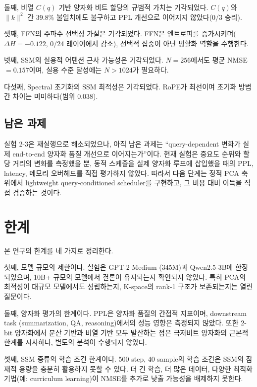 \documentclass[11pt,a4paper]{article}
\newcommand{\Cq}{C(q)}
\newcommand{\knorm}{\|k\|^2}
\begin{document}
둘째, 비열 $\Cq$ 기반 양자화 비트 할당의 규범적 가치는 기각되었다. $\Cq$와 $\knorm$ 간 39.8\% 불일치에도 불구하고 PPL 개선으로 이어지지 않았다(0/3 승리).

셋째, FFN의 주파수 선택성 가설은 기각되었다. FFN은 엔트로피를 증가시키며($\Delta H = -0.122$, 0/24 레이어에서 감소), 선택적 집중이 아닌 평활화 역할을 수행한다.

넷째, SSM의 실용적 어텐션 근사 가능성은 기각되었다. $N = 256$에서도 평균 NMSE $= 0.157$이며, 실용 수준 달성에는 $N > 1024$가 필요하다.

다섯째, Spectral 초기화의 SSM 최적성은 기각되었다. RoPE가 최선이며 초기화 방법 간 차이는 미미하다(범위 0.038).

\subsection{남은 과제}

실험 2-3은 재실행으로 해소되었으나, 아직 남은 과제는 ``query-dependent 변화가 실제 end-to-end 양자화 품질 개선으로 이어지는가''이다. 현재 실험은 중요도 순위와 할당 거리의 변화를 측정했을 뿐, 동적 스케줄을 실제 양자화 루프에 삽입했을 때의 PPL, latency, 메모리 오버헤드를 직접 평가하지 않았다. 따라서 다음 단계는 정적 PCA 축 위에서 lightweight query-conditioned scheduler를 구현하고, 그 비용 대비 이득을 직접 검증하는 것이다.

\section{한계}

본 연구의 한계를 네 가지로 정리한다.

첫째, 모델 규모의 제한이다. 실험은 GPT-2 Medium (345M)과 Qwen2.5-3B에 한정되었으며, 10B+ 규모의 모델에서 결론이 유지되는지 확인되지 않았다. 특히 PCA의 최적성이 대규모 모델에서도 성립하는지, K-space의 rank-1 구조가 보존되는지는 열린 질문이다.

둘째, 양자화 평가의 한계이다. PPL은 양자화 품질의 간접적 지표이며, downstream task (summarization, QA, reasoning)에서의 성능 영향은 측정되지 않았다. 또한 2-bit 양자화에서 분산 기반과 비열 기반 모두 발산하는 점은 극저비트 양자화의 근본적 한계를 시사하나, 별도의 분석이 수행되지 않았다.

셋째, SSM 증류의 학습 조건 한계이다. 500 step, 40 sample의 학습 조건은 SSM의 잠재적 용량을 충분히 활용하지 못할 수 있다. 더 긴 학습, 더 많은 데이터, 다양한 최적화 기법(예: curriculum learning)이 NMSE를 추가로 낮출 가능성을 배제하지 못한다.
\end{document}
